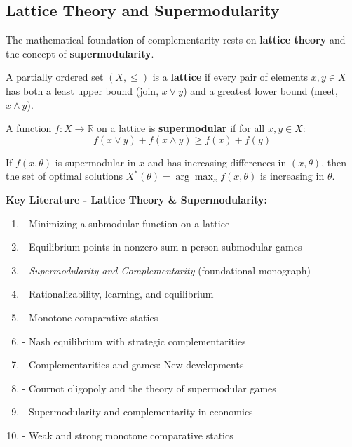 \subsection{Lattice Theory and Supermodularity}
\label{subsec:lattice-theory}

The mathematical foundation of complementarity rests on \textbf{lattice theory} and the concept of \textbf{supermodularity}.

\begin{definition}[Lattice]
A partially ordered set $(X, \leq)$ is a \textbf{lattice} if every pair of elements $x, y \in X$ has both a least upper bound (join, $x \vee y$) and a greatest lower bound (meet, $x \wedge y$).
\end{definition}

\begin{definition}[Supermodularity]
A function $f: X \to \mathbb{R}$ on a lattice is \textbf{supermodular} if for all $x, y \in X$:
\begin{equation}
f(x \vee y) + f(x \wedge y) \geq f(x) + f(y)
\label{eq:supermodularity}
\end{equation}
\end{definition}

\begin{theorem}[Topkis, 1978]
\label{thm:topkis}
If $f(x, \theta)$ is supermodular in $x$ and has increasing differences in $(x, \theta)$, then the set of optimal solutions $X^*(\theta) = \arg\max_x f(x, \theta)$ is increasing in $\theta$.
\end{theorem}

\textbf{Key Literature - Lattice Theory \& Supermodularity:}
\begin{enumerate}[noitemsep]
    \item \citet{topkis1978} - Minimizing a submodular function on a lattice
    \item \citet{topkis1979} - Equilibrium points in nonzero-sum n-person submodular games
    \item \citet{topkis1998} - \textit{Supermodularity and Complementarity} (foundational monograph)
    \item \citet{milgrom1990} - Rationalizability, learning, and equilibrium
    \item \citet{milgrom1994} - Monotone comparative statics
    \item \citet{vives1990} - Nash equilibrium with strategic complementarities
    \item \citet{vives2005} - Complementarities and games: New developments
    \item \citet{amir1996} - Cournot oligopoly and the theory of supermodular games
    \item \citet{amir2005} - Supermodularity and complementarity in economics
    \item \citet{shannon1995} - Weak and strong monotone comparative statics
\end{enumerate}

